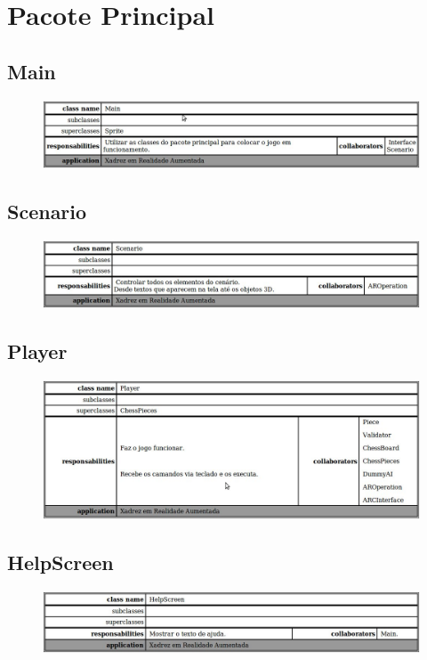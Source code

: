 \documentclass[a4paper,12pt]{book}
\begin{document}
  \section{Pacote Principal}
	\label{sec:crcpacoteprincipal}
    \subsection{Main}
    \label{subsec:crcmain}
    \begin{figure}[H]
	  \centering
	  \includegraphics[width=1.0\textwidth]{crc/Main}
	  \end{figure}
  	\subsection{Scenario}
    \label{subsec:crcscenario}
    \begin{figure}[H]
	  \centering
	  \includegraphics[width=1.0\textwidth]{crc/Scenario}
	  \end{figure}
  	\subsection{Player}
    \label{subsec:crcplayer}
    \begin{figure}[H]
	  \centering
	  \includegraphics[width=1.0\textwidth]{crc/Player}
	  \end{figure}
  	\subsection{HelpScreen}
    \label{subsec:crchelpscreen}
    \begin{figure}[H]
	  \centering
	  \includegraphics[width=1.0\textwidth]{crc/HelpScreen}
	  \end{figure}
\end{document}
